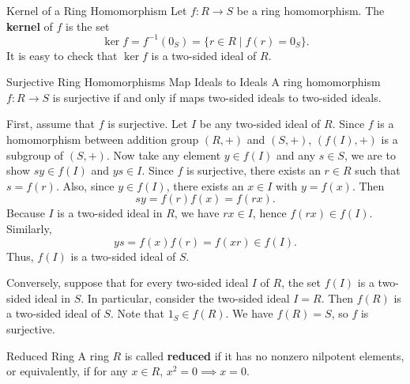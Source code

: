 \begin{definition}{Kernel of a Ring Homomorphism}{}
    Let $f:R\to S$ be a ring homomorphism. The \textbf{kernel} of $f$ is the set
    \[
        \ker f=f^{-1}(0_S)=\{r\in R\mid f(r)=0_S\}.
    \]
    It is easy to check that $\ker f$ is a two-sided ideal of $R$.
\end{definition}

\begin{proposition}{Surjective Ring Homomorphisms Map Ideals to Ideals}{}
    A ring homomorphism $f:R\to S$ is surjective if and only if maps two-sided ideals to two-sided ideals.
\end{proposition}
\begin{prf}
    First, assume that \( f \) is surjective. Let \( I \) be any two-sided ideal of \( R \). Since $f$ is a homomorphism between addition group $(R,+)$ and $(S,+)$, $(f(I),+)$ is a subgroup of $(S,+)$. Now take any element \( y \in f(I) \) and any \( s \in S \), we are to show $sy\in f(I)$ and $ys\in I$. Since \( f \) is surjective, there exists an \( r \in R \) such that \( s = f(r) \). Also, since \( y \in f(I) \), there exists an \( x \in I \) with \( y = f(x) \). Then
\[
s y = f(r) f(x) = f(rx).
\]
Because \( I \) is a two-sided ideal in \( R \), we have \( rx \in I \), hence \( f(rx) \in f(I) \). Similarly,
\[
y s = f(x) f(r) = f(xr) \in f(I).
\]
Thus, \( f(I) \) is a two-sided ideal of \( S \).

Conversely, suppose that for every two-sided ideal \( I \) of \( R \), the set \( f(I) \) is a two-sided ideal in \( S \). In particular, consider the two-sided ideal \( I = R \). Then \( f(R) \) is a two-sided ideal of \( S \). Note that \(1_S\in f(R) \). We have \( f(R) = S \), so \( f \) is surjective.

\end{prf}



\begin{definition}{Reduced Ring}{}
    A ring $R$ is called \textbf{reduced} if it has no nonzero nilpotent elements, or equivalently, if for any $x\in R$, $x^2=0\implies x=0$.
\end{definition}


